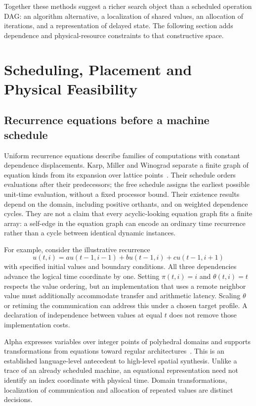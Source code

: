 \documentclass[final,3p,times,authoryear]{elsarticle}
\begin{document}
Together these methods suggest a richer search object than a scheduled operation DAG: an algorithm alternative, a localization of shared values, an allocation of iterations, and a representation of delayed state. The following section adds dependence and physical-resource constraints to that constructive space.


\section{Scheduling, Placement and Physical Feasibility}\label{sec:scheduling}
\subsection{Recurrence equations before a machine schedule}
Uniform recurrence equations describe families of computations with constant dependence displacements. Karp, Miller and Winograd separate a finite graph of equation kinds from its expansion over lattice points~\citep{kmw1967}. Their schedule orders evaluations after their predecessors; the free schedule assigns the earliest possible unit-time evaluation, without a fixed processor bound. Their existence results depend on the domain, including positive orthants, and on weighted dependence cycles. They are not a claim that every acyclic-looking equation graph fits a finite array: a self-edge in the equation graph can encode an ordinary time recurrence rather than a cycle between identical dynamic instances.

For example, consider the illustrative recurrence
\begin{equation}\label{eq:stencil}
 u(t,i)=a u(t-1,i-1)+b u(t-1,i)+c u(t-1,i+1)
\end{equation}
with specified initial values and boundary conditions. All three dependencies advance the logical time coordinate by one. Setting $\pi(t,i)=i$ and $\theta(t,i)=t$ respects the value ordering, but an implementation that uses a remote neighbor value must additionally accommodate transfer and arithmetic latency. Scaling $\theta$ or retiming the communication can address this under a chosen target profile. A declaration of independence between values at equal $t$ does not remove those implementation costs.

Alpha expresses variables over integer points of polyhedral domains and supports transformations from equations toward regular architectures~\citep{alpha1991}. This is an established language-level antecedent to high-level spatial synthesis. Unlike a trace of an already scheduled machine, an equational representation need not identify an index coordinate with physical time. Domain transformations, localization of communication and allocation of repeated values are distinct decisions.
\end{document}
